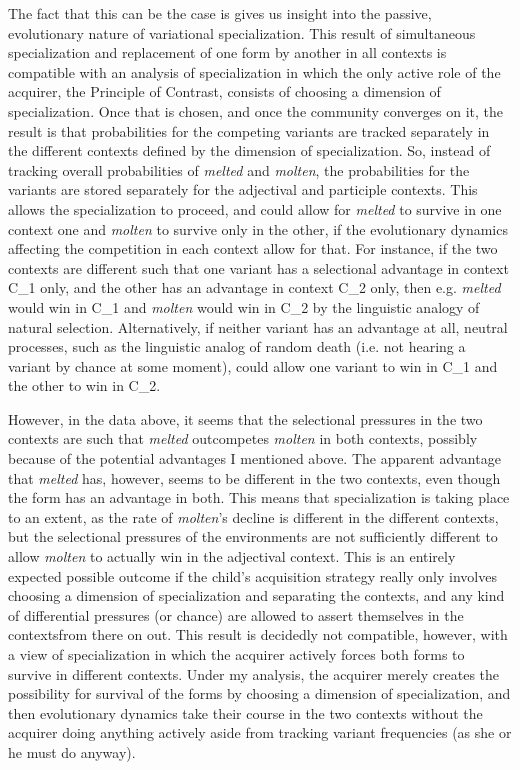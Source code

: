 \documentclass{artikel3}
\begin{document}
The fact that this can be the case is gives us insight into the passive, evolutionary nature of variational specialization. This result of simultaneous specialization and replacement of one form by another in all contexts is compatible with an analysis of specialization in which the only active role of the acquirer, the Principle of Contrast, consists of choosing a dimension of specialization. Once that is chosen, and once the community converges on it, the result is that probabilities for the competing variants are tracked separately in the different contexts defined by the dimension of specialization. So, instead of tracking overall probabilities of \textsl{melted} and \textsl{molten}, the probabilities for the variants are stored separately for the adjectival and participle contexts. This allows the specialization to proceed, and could allow for \textsl{melted} to survive in one context one and \textsl{molten} to survive only in the other, if the evolutionary dynamics affecting the competition in each context allow for that. For instance, if the two contexts are different such that one variant has a selectional advantage in context C_1 only, and the other has an advantage in context C_2 only, then e.g. \textsl{melted} would win in C_1 and \textsl{molten} would win in C_2 by the linguistic analogy of natural selection. Alternatively, if neither variant has an advantage at all, neutral processes, such as the linguistic analog of random death (i.e. not hearing a variant by chance at some moment), could allow one variant to win in C_1 and the other to win in C_2.

However, in the data above, it seems that the selectional pressures in the two contexts are such that \textsl{melted} outcompetes \textsl{molten} in both contexts, possibly because of the potential advantages I mentioned above. The apparent advantage that \textsl{melted} has, however, seems to be different in the two contexts, even though the form has an advantage in both. This means that specialization is taking place to an extent, as the rate of \textsl{molten}'s decline is different in the different contexts, but the selectional pressures of the environments are not sufficiently different to allow \textsl{molten} to actually win in the adjectival context. This is an entirely expected possible outcome if the child's acquisition strategy really only involves choosing a dimension of specialization and separating the contexts, and any kind of differential pressures (or chance) are allowed to assert themselves in the contextsfrom there on out. This result is decidedly not compatible, however, with a view of specialization in which the acquirer actively forces both forms to survive in different contexts. Under my analysis, the acquirer merely creates the possibility for survival of the forms by choosing a dimension of specialization, and then evolutionary dynamics take their course in the two contexts without the acquirer doing anything actively aside from tracking variant frequencies (as she or he must do anyway).
\end{document}
